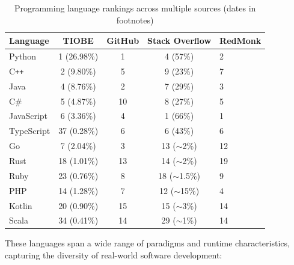 \documentclass{llmxive}
\begin{document}
\begin{table}[hbp]
\centering
\begin{tabular}{lcccl}
\toprule
\textbf{Language} & \textbf{TIOBE\footnotemark[1]} & \textbf{GitHub\footnotemark[2]} & \textbf{Stack Overflow\footnotemark[3]} & \textbf{RedMonk\footnotemark[4]} \\
\midrule
Python      & 1 (26.98\%) & 1       & 4 (57\%)         & 2  \\
C\texttt{++} & 2 (9.80\%)  & 5  & 9 (23\%)         & 7  \\
Java        & 4 (8.76\%)  & 2       & 7 (29\%)         & 3  \\
C\#         & 5 (4.87\%)  & 10  & 8 (27\%)         & 5  \\
JavaScript  & 6 (3.36\%)  & 4       & 1 (66\%)         & 1  \\
TypeScript  & 37 (0.28\%) & 6       & 6 (43\%)         & 6  \\
Go          & 7 (2.04\%)  & 3  & 13 ($\sim$2\%) & 12 \\
Rust        & 18 (1.01\%) & 13 & 14 ($\sim$2\%) & 19 \\
Ruby        & 23 (0.76\%) & 8  & 18 ($\sim$1.5\%) & 9 \\
PHP         & 14 (1.28\%) & 7  & 12 ($\sim$15\%)  & 4 \\
Kotlin      & 20 (0.90\%) & 15  & 15 ($\sim$3\%)   & 14 \\
Scala       & 34 (0.41\%) & 14   & 29 ($\sim$1\%)   & 14 \\
\bottomrule
\end{tabular}
\caption{Programming language rankings across multiple sources (dates in footnotes)}
\label{tab:lang-2025-en}
\end{table}

These languages span a wide range of paradigms and runtime characteristics, capturing the diversity of real-world software development:
\end{document}
